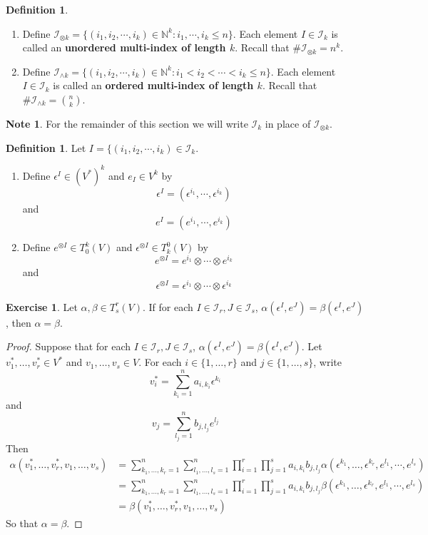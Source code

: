 \documentclass{book}
\theoremstyle{definition}
\newtheorem{defn}[definition]{Definition}
\newtheorem{note}[definition]{Note}
\newtheorem{ex}[definition]{Exercise}
\newcommand{\al}{\alpha}
\newcommand{\be}{\beta}
\newcommand{\ep}{\epsilon}
\newcommand{\N}{\mathbb{N}}
\newcommand{\MI}{\mathcal{I}}
\DeclareMathOperator*{\0}{\mbf{0}}
\DeclareMathOperator*{\1}{\mbf{1}}
\begin{document}
	
	\begin{defn}\
		\begin{enumerate}
		\item Define $\MI_{\otimes k} = \{(i_1, i_2, \cdots, i_k) \in \N^k: i_1,  \cdots,  i_k \leq n \}$. Each element $I \in \MI_{k}$ is called an \textbf{unordered multi-index of length $k$}. Recall that $\# \MI_{\otimes k} = n^k$. \\
		\item Define $\MI_{\wedge k} = \{(i_1, i_2, \cdots, i_k) \in \N^k: i_1 < i_2 < \cdots < i_k \leq n \}$. Each element $I \in \MI_{k}$ is called an \textbf{ordered multi-index of length $k$}. Recall that $\# \MI_{\wedge k} = {n \choose k}$. 
		\end{enumerate}
	\end{defn}
	
	\begin{note}
	For the remainder of this section we will write $\MI_k$ in place of $\MI_{\otimes k}$.
	\end{note}

	\begin{defn}
		Let $I = \{(i_1, i_2, \cdots, i_k) \in \MI_k$. \\ 
		\begin{enumerate}
		\item Define $\ep^I \in (V^*)^k$ and $e_I \in V^k$  by  $$\ep^I = (\ep^{i_1}, \cdots, \ep^{i_k})$$ 
		and 
		$$e^I = (e^{i_1}, \cdots, e^{i_k})$$ 
		\item Define $e^{\otimes I} \in T^k_0(V)$ and $\ep^{\otimes I} \in T^0_k(V)$ by 
		$$e^{\otimes I} = e^{i_1} \otimes \cdots \otimes e^{i_k}$$ 
		and 
		$$\ep^{\otimes I} = \ep^{i_1} \otimes \cdots \otimes \ep^{i_k}$$
		\end{enumerate}
	\end{defn}
	
	\begin{ex}
	Let $\al, \be \in T^r_s(V)$. If for each $I \in \MI_r, J \in \MI_s$, $\al(\ep^I, e^J) = \be(\ep^I, e^J)$, then $\al = \be$.
	\end{ex}
	
	\begin{proof}
	Suppose that for each $I \in \MI_r, J \in \MI_s$, $\al(\ep^I, e^J) = \be(\ep^I, e^J)$. Let $v^*_1, \dots, v^*_r \in V^*$ and $v_1, \dots, v_s \in V$. For each $i \in \{1, \dots, r\}$ and $j \in \{1, \dots, s\}$, write $$v^*_i = \sum\limits_{k_i = 1}^n a_{i, k_i} \ep^{k_i}$$ and $$v_j = \sum\limits_{l_j = 1}^n b_{j, l_j} e^{l_j}$$
	Then 
	\begin{align*}
	\al(v^*_1, \dots, v^*_r, v_1, \dots, v_s)
	&= \sum_{k_1, \dots, k_r =1}^n \sum_{l_1, \dots, l_s = 1}^n \prod_{i=1}^r \prod_{j=1}^s a_{i, k_i} b_{j, l_j} \al(\ep^{k_1}, \dots, \ep^{k_r}, e^{l_1}, \cdots, e^{l_s}) \\
	&= \sum_{k_1, \dots, k_r =1}^n \sum_{l_1, \dots, l_s = 1}^n \prod_{i=1}^r \prod_{j=1}^s a_{i, k_i} b_{j, l_j} \be(\ep^{k_1}, \dots, \ep^{k_r}, e^{l_1}, \cdots, e^{l_s}) \\
	&= \be(v^*_1, \dots, v^*_r, v_1, \dots, v_s)
	\end{align*}
	So that $\al = \be$.
	\end{proof}
		
\end{document}
